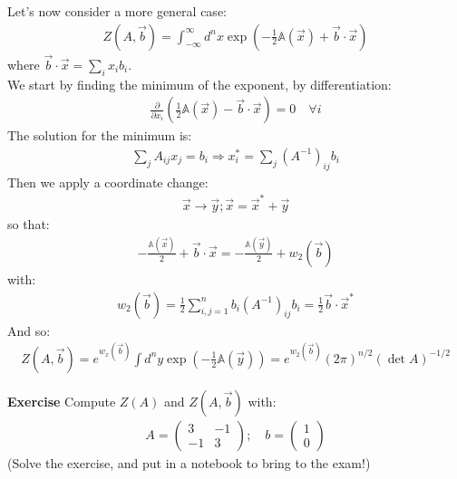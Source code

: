 \documentclass[../template.tex]{subfiles}
\begin{document}
Let's now consider a more general case:
\begin{align*}
    Z(A, \vec{b}) = \int_{-\infty}^{\infty} d^n x \exp\left(-\frac{1}{2} \mathbb{A}(\vec{x}) + \vec{b} \cdot \vec{x} \right)
\end{align*}
where $\vec{b}\cdot \vec{x} = \sum_i x_i b_i$.\\
We start by finding the minimum of the exponent, by differentiation:
\begin{align*}
    \frac{\partial}{\partial x_i} \left(\frac{1}{2} \mathbb{A}(\vec{x}) - \vec{b} \cdot \vec{x} \right)  = 0 \quad \forall i
\end{align*} 
The solution for the minimum is:
\begin{align*}
    \sum_j A_{ij} x_j = b_i \Rightarrow x_i^* = \sum_j (A^{-1})_{ij} b_i
\end{align*}
Then we apply a coordinate change:
\begin{align*}
    \vec{x} \rightarrow \vec{y}; \vec{x} = \vec{x}^* + \vec{y}
\end{align*}
so that:
\begin{align*}
    -\frac{\mathbb{A}(\vec{x})}{2} + \vec{b}\cdot \vec{x} = -\frac{\mathbb{A}(\vec{y})}{2} + w_2(\vec{b})  
\end{align*}
with:
\begin{align*}
    w_2(\vec{b}) = \frac{1}{2} \sum_{i,j=1}^n b_i (A^{-1})_{ij} b_i = \frac{1}{2} \vec{b}\cdot \vec{x}^*  
\end{align*}
And so:
\begin{align*}
    Z(A,\vec{b}) = e^{w_x(\vec{b})} \int d^n y \exp \left(-\frac{1}{2} \mathbb{A}(\vec{y}) \right) = e^{w_2(\vec{b})} (2\pi)^{n/2} (\operatorname{det} A )^{-1/2}
\end{align*}

\textbf{Exercise}
Compute $Z(A)$ and $Z(A,\vec{b})$ with:
\begin{align*}
    A = \left(\begin{array}{cc}
    3 & -1 \\ 
    -1 & 3
    \end{array}\right); \quad b = \left(\begin{array}{c}
    1 \\ 
    0
    \end{array}\right)
\end{align*}   
(Solve the exercise, and put in a notebook to bring to the exam!)
\end{document}
